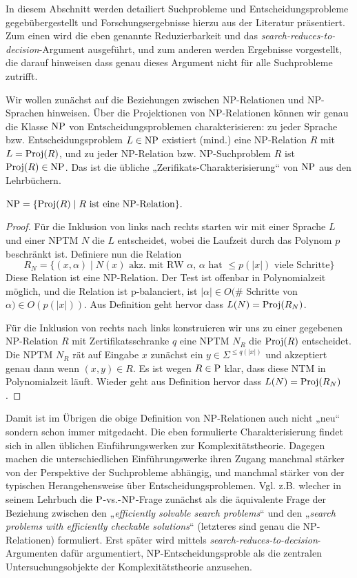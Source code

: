 In diesem Abschnitt werden detailiert Suchprobleme und Entscheidungsprobleme gegebübergestellt und Forschungsergebnisse hierzu aus der Literatur präsentiert.
Zum einen wird die eben genannte Reduzierbarkeit und das \emph{search-reduces-to-decision}-Argument ausgeführt, und zum anderen werden Ergebnisse vorgestellt, die darauf hinweisen dass genau dieses Argument nicht für alle Suchprobleme zutrifft.

Wir wollen zunächst auf die Beziehungen zwischen NP-Relationen und NP-Sprachen hinweisen.
Über die Projektionen von NP-Relationen können wir genau die Klasse $\NP$ von Entscheidungsproblemen charakterisieren: zu jeder Sprache bzw. Entscheidungsproblem $L\in \NP$ existiert (mind.) eine NP-Relation $R$ mit $L=\Proj(R)$, und zu jeder NP-Relation bzw. NP-Suchproblem $R$ ist $\Proj(R)\in\NP$. Das ist die übliche „Zerifikats-Charakterisierung“ von $\NP$ aus den Lehrbüchern.
\begin{observation}\label{obs:np-certificate-def}
    $\NP = \{ \Proj(R) \mid \text{$R$ ist eine NP-Relation} \}.$
\end{observation}
\begin{proof}
    Für die Inklusion von links nach rechts starten wir mit einer Sprache $L$ und einer NPTM $N$ die $L$ entscheidet, wobei die Laufzeit durch das Polynom $p$ beschränkt ist. Definiere nun die Relation
    \[ R_N = \{ (x, \alpha) \mid \text{$N(x)$ akz. mit RW $\alpha$, $\alpha$ hat $\leq p(|x|)$ viele Schritte} \} \]
    Diese Relation ist eine NP-Relation. Der Test ist offenbar in Polynomialzeit möglich, und die Relation ist p-balanciert, ist $|\alpha|\in O($\# Schritte von $\alpha)\in O(p(|x|))$.
    Aus Definition geht hervor dass $L(N) = \Proj(R_N)$.

    Für die Inklusion von rechts nach links konstruieren wir uns zu einer gegebenen NP-Relation $R$ mit Zertifikatsschranke $q$ eine NPTM $N_R$ die $\Proj(R)$ entscheidet. Die NPTM $N_R$ rät auf Eingabe $x$ zunächst ein $y\in\Sigma^{\leq q(|x|)}$ und akzeptiert genau dann wenn $(x,y)\in R$.
    Es ist wegen $R\in \P$ klar, dass diese NTM in Polynomialzeit läuft.
    Wieder geht aus Definition hervor dass $L(N) = \Proj(R_N)$.
\end{proof}
Damit ist im Übrigen die obige Definition von NP-Relationen auch nicht „neu“ sondern schon immer mitgedacht. Die eben formulierte Charakterisierung findet sich in allen üblichen Einführungswerken zur Komplexitätstheorie. Dagegen machen die unterschiedlichen Einführungswerke ihren Zugang manchmal stärker von der Perspektive der Suchprobleme abhängig, und manchmal stärker von der typischen Herangehensweise über Entscheidungsproblemen.
Vgl. z.B. \textcite{goldreich_computational_2008} wlecher in seinem Lehrbuch die $\P$-vs.-$\NP$-Frage zunächst als die äquivalente Frage der Beziehung zwischen den „\emph{efficiently solvable search problems}“ und den „\emph{search problems with efficiently checkable solutions}“ (letzteres sind genau die NP-Relationen) formuliert. Erst später wird mittels \emph{search-reduces-to-decision}-Argumenten dafür argumentiert, NP-Entscheidungsproble als die zentralen Untersuchungsobjekte der Komplexitätstheorie anzusehen.

